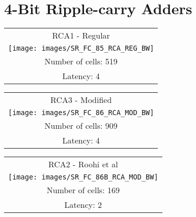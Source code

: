\pagebreak
\section{4-Bit Ripple-carry Adders}
\flushleft
\center
\begin{tabular}[h]{c}
  RCA1 - Regular \\
  \texttt{[image: images/SR\_FC\_85\_RCA\_REG\_BW]}\\
    Number of cells: 519\\
  	Latency: 4 \\
\end{tabular}
\linebreak

\begin{tabular}[h]{c}
  RCA3 - Modified \\
  \texttt{[image: images/SR\_FC\_86\_RCA\_MOD\_BW]}\\
  Number of cells: 909 \\ 
  Latency: 4\\
\end{tabular}

\pagebreak
\begin{tabular}[h]{c}
  RCA2 - Roohi et al \\
  \texttt{[image: images/SR\_FC\_86B\_RCA\_MOD\_BW]}\\
  Number of cells: 169 \\ 
  Latency: 2\\
\end{tabular}

\flushleft